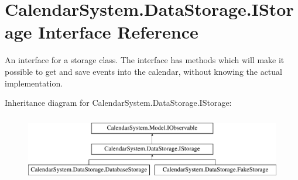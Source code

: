 \hypertarget{interface_calendar_system_1_1_data_storage_1_1_i_storage}{\section{Calendar\+System.\+Data\+Storage.\+I\+Storage Interface Reference}
\label{interface_calendar_system_1_1_data_storage_1_1_i_storage}
}


An interface for a storage class. The interface has methods which will make it possible to get and save events into the calendar, without knowing the actual implementation.  


Inheritance diagram for Calendar\+System.\+Data\+Storage.\+I\+Storage\+:\begin{figure}[H]
\begin{center}
\leavevmode
\includegraphics[height=2.926829cm]{interface_calendar_system_1_1_data_storage_1_1_i_storage}
\end{center}
\end{figure}
